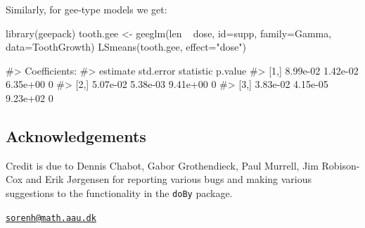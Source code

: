 Similarly, for gee-type models we get:

\begin{Schunk}
\begin{Sinput}
library(geepack)
tooth.gee <- geeglm(len ~ dose, id=supp, family=Gamma, data=ToothGrowth)
LSmeans(tooth.gee, effect="dose")
\end{Sinput}
\begin{Soutput}
#> Coefficients:
#>      estimate std.error statistic p.value
#> [1,] 8.99e-02  1.42e-02  6.35e+00       0
#> [2,] 5.07e-02  5.38e-03  9.41e+00       0
#> [3,] 3.83e-02  4.15e-05  9.23e+02       0
\end{Soutput}
\end{Schunk}

\hypertarget{acknowledgements}{%
\subsection{Acknowledgements}\label{acknowledgements}}

Credit is due to Dennis Chabot, Gabor Grothendieck, Paul Murrell, Jim
Robison-Cox and Erik Jørgensen for reporting various bugs and making
various suggestions to the functionality in the \texttt{doBy} package.




\address{%
Søren Højsgaard\\
Department of Mathematical Sciences, Aalborg University, Denmark\\
Skjernvej 4A\\ 9220 Aalborg Ø, Denmark\\
}
\href{mailto:sorenh@math.aau.dk}{\nolinkurl{sorenh@math.aau.dk}}

